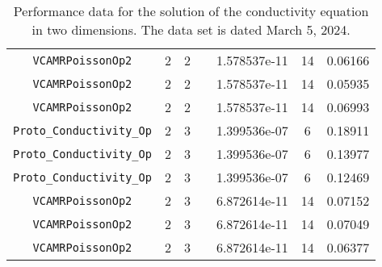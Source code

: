 \documentclass{article}
\begin{document}
\begin{small}
\begin{table}
\begin{center}
\begin{tabular}{|c|c|c|c|c|c||c|}
 {\tt VCAMRPoissonOp2}              & 2 & 2 &    & 1.578537e-11   & 14      & 0.06166    \\
 {\tt VCAMRPoissonOp2}              & 2 & 2 &    & 1.578537e-11   & 14      & 0.05935    \\
 {\tt VCAMRPoissonOp2}              & 2 & 2 &    & 1.578537e-11   & 14      & 0.06993    \\
\hline
 {\tt Proto\_Conductivity\_Op}      & 2 & 3 &    & 1.399536e-07   & 6       & 0.18911    \\
 {\tt Proto\_Conductivity\_Op}      & 2 & 3 &    & 1.399536e-07   & 6       & 0.13977    \\
 {\tt Proto\_Conductivity\_Op}      & 2 & 3 &    & 1.399536e-07   & 6       & 0.12469    \\
\hline                                                                           
 {\tt VCAMRPoissonOp2}              & 2 & 3 &    & 6.872614e-11   & 14      & 0.07152    \\
 {\tt VCAMRPoissonOp2}              & 2 & 3 &    & 6.872614e-11   & 14      & 0.07049    \\
 {\tt VCAMRPoissonOp2}              & 2 & 3 &    & 6.872614e-11   & 14      & 0.06377    \\
 \hline
\end{tabular}
\end{center}
\label{tab::5}
\caption
    {
      Performance data for the solution of the conductivity
      equation in two dimensions.    
      The data set is dated March 5, 2024.
    }
\end{table}
\end{small}
\end{document}
